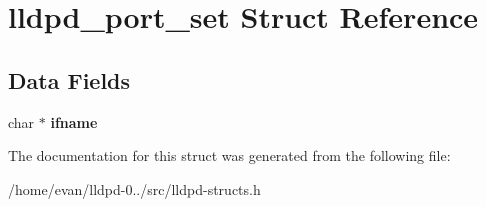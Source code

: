 \section{lldpd\-\_\-port\-\_\-set \-Struct \-Reference}
\label{structlldpd__port__set}
\subsection*{\-Data \-Fields}
\begin{DoxyCompactItemize}
\item 
char $\ast$ {\bfseries ifname}\label{structlldpd__port__set_a57634e15933b3c82405e0bbe1e270d1b}

\end{DoxyCompactItemize}


\-The documentation for this struct was generated from the following file\-:\begin{DoxyCompactItemize}
\item 
/home/evan/lldpd-\/0../src/lldpd-\/structs.\-h\end{DoxyCompactItemize}
